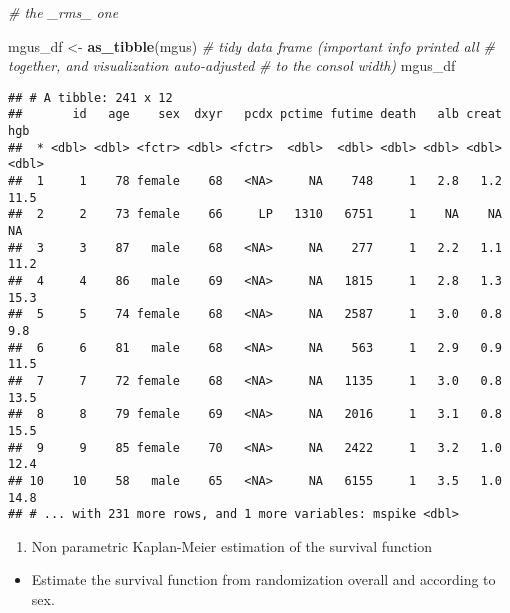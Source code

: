 \documentclass[]{book}
\newenvironment{Shaded}{\begin{snugshade}}{\end{snugshade}}
\newcommand{\KeywordTok}[1]{\textcolor[rgb]{0.13,0.29,0.53}{\textbf{{#1}}}}
\newcommand{\StringTok}[1]{\textcolor[rgb]{0.31,0.60,0.02}{{#1}}}
\newcommand{\CommentTok}[1]{\textcolor[rgb]{0.56,0.35,0.01}{\textit{{#1}}}}
\newcommand{\NormalTok}[1]{{#1}}
\providecommand{\tightlist}{%
  \setlength{\itemsep}{0pt}\setlength{\parskip}{0pt}}
\theoremstyle{definition}
\theoremstyle{definition}
\theoremstyle{definition}
\theoremstyle{remark}
\begin{document}
\begin{Shaded}
\begin{Highlighting}[]
                 \CommentTok{# the _rms_ one}

\NormalTok{mgus_df <-}\StringTok{ }\KeywordTok{as_tibble}\NormalTok{(mgus)         }\CommentTok{# tidy data frame (important info printed all}
                                   \CommentTok{# together, and visualization auto-adjusted}
                                   \CommentTok{# to the consol width)}
\NormalTok{mgus_df}
\end{Highlighting}
\end{Shaded}

\begin{verbatim}
## # A tibble: 241 x 12
##       id   age    sex  dxyr   pcdx pctime futime death   alb creat   hgb
##  * <dbl> <dbl> <fctr> <dbl> <fctr>  <dbl>  <dbl> <dbl> <dbl> <dbl> <dbl>
##  1     1    78 female    68   <NA>     NA    748     1   2.8   1.2  11.5
##  2     2    73 female    66     LP   1310   6751     1    NA    NA    NA
##  3     3    87   male    68   <NA>     NA    277     1   2.2   1.1  11.2
##  4     4    86   male    69   <NA>     NA   1815     1   2.8   1.3  15.3
##  5     5    74 female    68   <NA>     NA   2587     1   3.0   0.8   9.8
##  6     6    81   male    68   <NA>     NA    563     1   2.9   0.9  11.5
##  7     7    72 female    68   <NA>     NA   1135     1   3.0   0.8  13.5
##  8     8    79 female    69   <NA>     NA   2016     1   3.1   0.8  15.5
##  9     9    85 female    70   <NA>     NA   2422     1   3.2   1.0  12.4
## 10    10    58   male    65   <NA>     NA   6155     1   3.5   1.0  14.8
## # ... with 231 more rows, and 1 more variables: mspike <dbl>
\end{verbatim}

\begin{enumerate}
\def\labelenumi{\arabic{enumi}.}
\setcounter{enumi}{1}
\tightlist
\item
  Non parametric Kaplan-Meier estimation of the survival function
\end{enumerate}

\begin{itemize}
\tightlist
\item
  Estimate the survival function from randomization overall and
  according to sex.
\end{itemize}
\end{document}
